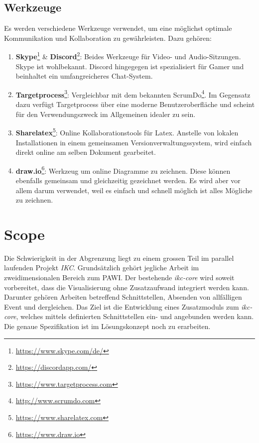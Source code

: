\subsection{Werkzeuge}

Es werden verschiedene Werkzeuge verwendet, um eine möglichst optimale Kommunikation und Kollaboration zu gewährleisten. Dazu gehören:
\begin{enumerate}
\item \textbf{Skype}\footnote{\url{https://www.skype.com/de/}} \& \textbf{Discord}\footnote{\url{https://discordapp.com/}}: Beides Werkzeuge für Video- und Audio-Sitzungen. Skype ist wohlbekannt. Discord hingegegen ist spezialisiert für Gamer und beinhaltet ein umfangreicheres Chat-System.
\item \textbf{Targetprocess}\footnote{\url{https://www.targetprocess.com}}: Vergleichbar mit dem bekannten ScrumDo\footnote{\url{http://www.scrumdo.com}}. Im Gegensatz dazu verfügt Targetprocess über eine moderne Benutzeroberfläche und scheint für den Verwendungszweck im Allgemeinen idealer zu sein.
\item \textbf{Sharelatex}\footnote{\url{https://www.sharelatex.com}}: Online Kollaborationstools für Latex. Anstelle von lokalen Installationen in einem gemeinsamen Versionverwaltungssystem, wird einfach direkt online am selben Dokument gearbeitet.
\item \textbf{draw.io}\footnote{\url{https://www.draw.io}}: Werkzeug um online Diagramme zu zeichnen. Diese können ebenfalls gemeinsam und gleichzeitig gezeichnet werden. Es wird aber vor allem darum verwendet, weil es einfach und schnell möglich ist alles Mögliche zu zeichnen.
\end{enumerate}

\section{Scope}
\label{sec:scope}

Die Schwierigkeit in der Abgrenzung liegt zu einem grossen Teil im parallel laufenden Projekt \textit{IKC}. Grundsätzlich gehört jegliche Arbeit im zweidimensionalen Bereich zum PAWI. Der bestehende \textit{ikc-core} wird soweit vorbereitet, dass die Visualisierung ohne Zusatzaufwand integriert werden kann. Darunter gehören Arbeiten betreffend Schnittstellen, Absenden von allfälligen Event und dergleichen. Das Ziel ist die Entwicklung eines Zusatzmoduls zum \textit{ikc-core}, welches mittels definierten Schnittstellen ein- und angebunden werden kann. Die genaue Spezifikation ist im Lösungskonzept noch zu erarbeiten.

